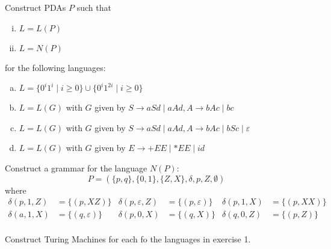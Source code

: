 \begin{solution}
\begin{enumerate}[(a)]
    \end{enumerate}
\end{solution}

\begin{exercise}{2}
    Construct PDAs \(P\) such that
    \begin{enumerate}[i.]
        \item \(L=L(P)\)
        \item \(L=N(P)\)
    \end{enumerate}
    for the following languages:
    \begin{enumerate}[(a)]
        \item \(L=\{0^i1^i\mid i\geq0\} \cup \{0^i1^{2i}\mid i\geq0\}\)
        \item \(L=L(G)\) with \(G\) given by \(S\to aSd\mid aAd, A\to bAc\mid bc\)
        \item \(L=L(G)\) with \(G\) given by \(S\to aSd\mid aAd, A\to bAc\mid bSc\mid\varepsilon \)
        \item \(L=L(G)\) with \(G\) given by \(E\to +EE\mid *EE\mid id\)
    \end{enumerate}
\end{exercise}

\begin{exercise}{3}
    Construct a grammar for the language \(N(P)\):
        \[P = (\{p, q\}, \{0, 1\}, \{Z, X\}, \delta, p, Z, \emptyset)\]
    where
        \begin{align*}
            \delta(p, 1, Z) &= \{(p, XZ)\} &\delta(p, \varepsilon, Z) &= \{(p, \varepsilon)\} &\delta(p, 1, X) &= \{(p, XX)\}\\
            \delta(a, 1, X) &= \{(q, \varepsilon)\} &\delta(p, 0, X) &= \{(q, X)\} &\delta(q, 0, Z) &= \{(p, Z)\}\\
        \end{align*}
\end{exercise}

\begin{exercise}{4}
    Construct Turing Machines for each fo the languages in exercise 1.
\end{exercise}